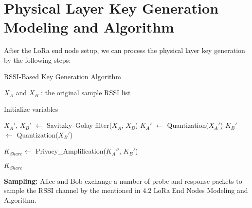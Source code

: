 \section{Physical Layer Key Generation Modeling and Algorithm}
After the LoRa end node setup, we can process the physical layer key generation by the following steps:
\begin{algorithm}[hbt!]
  \caption{RSSI-Based Key Generation Algorithm}\label{alg:keygeneration}
  \begin{algorithmic}
  
  \Require $X_A$ and $X_B$ :  the original sample RSSI list
  
  \State Initialize variables
  
  \State $X_A'$, $X_B'$ $\gets$ Savitzky–Golay filter($X_A$, $X_B$)
  \Repeat
      \State $K_A'$ $\gets$ Quantization($X_A'$)
      \State $K_B'$ $\gets$ Quantization($X_B'$)
  
  \State $K_{Share} \gets$ Privacy\_Amplification($K_A''$, $K_B'$)
  
  \State \Return $K_{Share}$ 
  
  \end{algorithmic}
\end{algorithm}

\textbf{Sampling:} Alice and Bob exchange a number of probe and response packets to sample the RSSI channel by the mentioned in 4.2 LoRa End Nodes Modeling and Algorithm.


